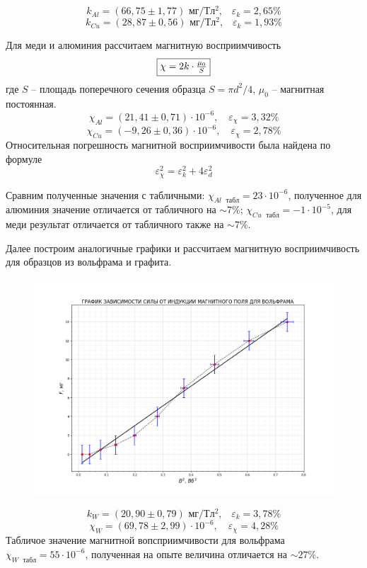 \documentclass[a4paper,12pt]{article}
\begin{document}
\[k_{Al} = (66,75 \pm 1,77) \text{ мг/$Тл^2$,} \quad \varepsilon_{k} = 2,65 \%\]
\[k_{Cu} = (28,87 \pm 0,56) \text{ мг/$Тл^2$,} \quad \varepsilon_{k} = 1,93 \%\]

Для меди и алюминия рассчитаем магнитную восприимчивость
\[ \fbox{$\chi = 2 k \cdot \frac{\mu_0}{S}$} \]
где $S$ -- площадь поперечного сечения образца $S =\pi d^2 / 4$, $\mu_0$ -- магнитная постоянная.
\[\chi_{Al} = (21,41 \pm 0,71) \cdot 10^{-6}, \quad \varepsilon_{\chi} = 3,32\%\]
\[\chi_{Cu} = (-9,26 \pm 0,36) \cdot 10^{-6}, \quad \varepsilon_{\chi} = 2,78\%\]
Относительная погрешность магнитной восприимчивости была найдена по формуле
\[\varepsilon_{\chi}^2 = \varepsilon_k^2 + 4\varepsilon_d^2\]

Сравним полученные значения с табличными: $\chi_{Al \text{ }табл} = 23 \cdot 10^{-6}$, полученное для алюминия значение отличается от табличного на $\sim 7\%$; $\chi_{Cu \text{ }табл} = -1 \cdot 10^{-5}$, для меди результат отличается от табличного также на $\sim 7 \%$.

Далее построим аналогичные графики и рассчитаем магнитную восприимчивость для образцов из вольфрама и графита.

\begin{figure}[H]\label{fig: W}
    \centering
    \includegraphics[width = \textwidth]{F(B2)W.png}
\end{figure}
\[k_{W} = (20,90 \pm 0,79) \text{ мг/$Тл^2$,} \quad \varepsilon_{k} = 3,78 \%\]
\[\chi_{W} = (69,78 \pm 2,99) \cdot 10^{-6}, \quad \varepsilon_{\chi} = 4,28\%\]
Табличое значение магнитной вопсприимчивости для вольфрама $\chi_{W \text{ }табл} = 55 \cdot 10^{-6}$, полученная на опыте величина отличается на $\sim 27\%$.
\end{document}
